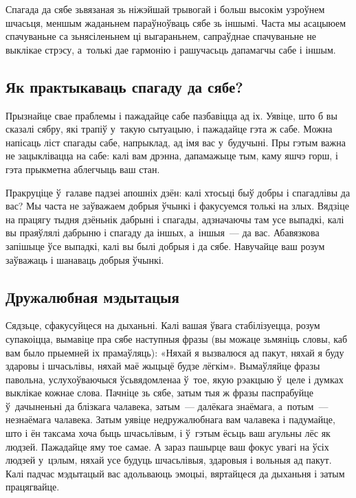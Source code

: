 
Спагада да сябе зьвязаная зь ніжэйшай трывогай і больш высокім узроўнем шчасьця, меншым жаданьнем параўноўваць сябе зь іншымі. Часта мы асацыюем спачуваньне са зьнясіленьнем ці выгараньнем, сапраўднае спачуваньне не выклікае стрэсу, а~толькі дае гармонію і рашучасьць дапамагчы сабе і іншым.

\subsection*{Як практыкаваць спагаду да сябе?}

Прызнайце свае праблемы і пажадайце сабе пазбавіцца ад іх. Уявіце, што б вы сказалі сябру, які трапіў у~такую сытуацыю, і пажадайце гэта ж сабе. Можна напісаць ліст спагады сабе, напрыклад, ад імя вас у~будучыні. Пры гэтым важна не зацыклівацца на сабе: калі вам дрэнна, дапамажыце тым, каму яшчэ горш, і гэта прыкметна аблегчыць ваш стан.

Пракруціце ў~галаве падзеі апошніх дзён: калі хтосьці быў добры і спагадлівы да вас? Мы часта не заўважаем добрыя ўчынкі і факусуемся толькі на злых. Вядзіце на працягу тыдня дзёньнік дабрыні і спагады, адзначаючы там усе выпадкі, калі вы праяўлялі дабрыню і спагаду да іншых, а~іншыя~--- да вас. Абавязкова запішыце ўсе выпадкі, калі вы былі добрыя і да сябе. Навучайце ваш розум заўважаць і шанаваць добрыя ўчынкі.

\subsection*{Дружалюбная мэдытацыя}

Сядзьце, сфакусуйцеся на дыханьні. Калі вашая ўвага стабілізуецца, розум супакоіцца, вымавіце пра сябе наступныя фразы (вы можаце зьмяніць словы, каб вам было прыемней іх прамаўляць): «Няхай я вызвалюся ад пакут, няхай я буду здаровы і шчасьлівы, няхай маё жыцьцё будзе лёгкім». Вымаўляйце фразы павольна, услухоўваючыся ўсьвядомленаа ў~тое, якую рэакцыю ў~целе і думках выклікае кожнае слова. Пачніце зь сябе, затым тыя ж фразы паспрабуйце ў~дачыненьні да блізкага чалавека, затым~--- далёкага знаёмага, а~потым~--- незнаёмага чалавека. Затым уявіце недружалюбнага вам чалавека і падумайце, што і ён таксама хоча быць шчасьлівым, і ў~гэтым ёсьць ваш агульны лёс як людзей. Пажадайце яму тое самае. А зараз пашырце ваш фокус увагі на ўсіх людзей у~цэлым, няхай усе будуць шчасьлівыя, здаровыя і вольныя ад пакут. Калі падчас мэдытацый вас адольваюць эмоцыі, вяртайцеся да дыханьня і затым працягвайце.

